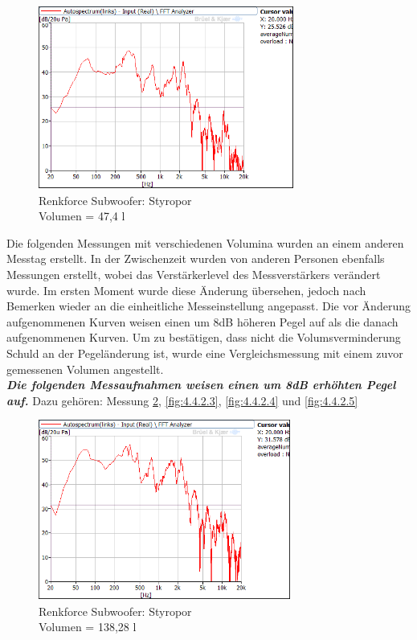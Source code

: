 \begin{figure} [H]
\centering
\includegraphics[width=0.75\textwidth]{img/Optimierung/Sub/RenkforceStyro_47l.png}
\caption{Renkforce Subwoofer: Styropor \\Volumen = 47,4 l}
\label{fig:4.4.2.1}
\end{figure}

Die folgenden Messungen mit verschiedenen Volumina wurden an einem anderen Messtag erstellt.
In der Zwischenzeit wurden von anderen Personen ebenfalls Messungen erstellt, wobei das Verstärkerlevel des Messverstärkers verändert wurde.
Im ersten Moment wurde diese Änderung übersehen, jedoch nach Bemerken wieder an die einheitliche Messeinstellung angepasst.
Die vor Änderung aufgenommenen Kurven weisen einen um 8dB höheren Pegel auf als die danach aufgenommenen Kurven.
Um zu bestätigen, dass nicht die Volumsverminderung Schuld an der Pegeländerung ist, wurde eine Vergleichsmessung mit einem zuvor gemessenen Volumen angestellt.\\

\textit{\textbf{ Die folgenden Messaufnahmen weisen einen um 8dB erhöhten Pegel auf.}} Dazu gehören: Messung \ref{fig:4.4.2.2}, \ref{fig:4.4.2.3}, \ref{fig:4.4.2.4} und \ref{fig:4.4.2.5}\\

\begin{figure} [H]
\centering
\includegraphics[width=0.74\textwidth]{img/Optimierung/Sub/RenkforceStyro_138l.png}
\caption{Renkforce Subwoofer: Styropor \\Volumen = 138,28 l}
\label{fig:4.4.2.2}
\end{figure}

